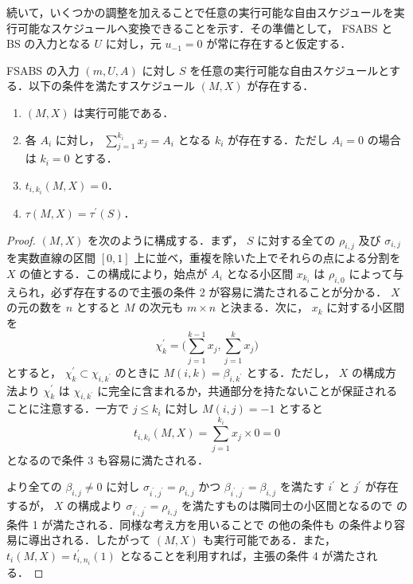 続いて，いくつかの調整を加えることで任意の実行可能な自由スケジュールを実行可能なスケジュールへ変換できることを示す．その準備として， FSABS と BS の入力となる $U$ に対し，元 $u_{-1} = 0$ が常に存在すると仮定する．
\begin{lemma}\label{lemma:fsabs-to-bs}
  FSABS の入力 $(m, U, A)$ に対し $S$ を任意の実行可能な自由スケジュールとする．以下の条件を満たすスケジュール $(M, X)$ が存在する．
  \begin{enumerate}
  \item $(M, X)$ は実行可能である．
  \item 各 $A_i$ に対し， $\sum_{j=1}^{k_i}x_j = A_i$ となる $k_i$ が存在する．ただし $A_i = 0$ の場合は $k_i = 0$ とする．
  \item $t_{i,k_i}(M, X) = 0$．
  \item $\tau(M, X) = \tau^\prime(S)$．
  \end{enumerate}
\end{lemma}
\begin{proof}
  $(M, X)$ を次のように構成する．まず， $S$ に対する全ての $\rho_{i,j}$ 及び $\sigma_{i,j}$ を実数直線の区間 $[0, 1]$ 上に並べ，重複を除いた上でそれらの点による分割を $X$ の値とする．この構成により，始点が $A_i$ となる小区間 $x_{k_i}$ は $\rho_{i,0}$ によって与えられ，必ず存在するので主張の条件 2 が容易に満たされることが分かる． $X$ の元の数を $n$ とすると $M$ の次元も $m\times n$ と決まる．次に， $x_k$ に対する小区間を
  \begin{equation}
    \chi^\prime_k = \Big(\sum_{j=1}^{k-1} x_j, \sum_{j=1}^{k} x_j\Big)
  \end{equation}
  とすると， $\chi^\prime_k \subset \chi_{i,k^\prime}$ のときに $M(i,k) = \beta_{i,k^\prime}$ とする．ただし， $X$ の構成方法より $\chi^\prime_k$ は $\chi_{i,k^\prime}$ に完全に含まれるか，共通部分を持たないことが保証されることに注意する．一方で $j \leq k_i$ に対し $M(i,j) = -1$ とすると
  \begin{equation}
    t_{i,k_i}(M, X) = \sum_{j = 1}^{k_i} x_j \times 0 = 0
  \end{equation}
  となるので条件 3 も容易に満たされる．

   より全ての $\beta_{i,j} \neq 0$ に対し $\sigma_{i^\prime, j^\prime} = \rho_{i,j}$ かつ $\beta_{i^\prime, j^\prime} = \beta_{i,j}$ を満たす $i^\prime$ と $j^\prime$ が存在するが， $X$ の構成より $\sigma_{i^\prime, j^\prime} = \rho_{i,j}$ を満たすものは隣同士の小区間となるので  の条件 1 が満たされる．同様な考え方を用いることで  の他の条件も  の条件より容易に導出される．したがって $(M, X)$ も実行可能である．また， $t_i(M, X) = t^\prime_{i,n_i}(1)$ となることを利用すれば，主張の条件 4 が満たされる．
\end{proof}

